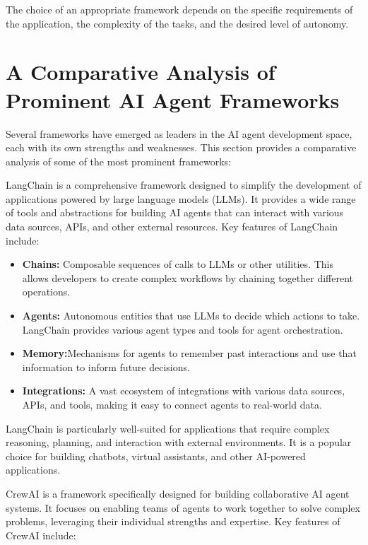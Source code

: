 \documentclass[a4paper,headinclude=on,footinclude=on,12pt,oneside]{scrbook}
\begin{document}
The choice of an appropriate framework depends on the specific requirements of the application, the complexity of the tasks, and the desired level of autonomy.

\section*{A Comparative Analysis of Prominent AI Agent Frameworks}

Several frameworks have emerged as leaders in the AI agent development space, each with its own strengths and weaknesses. This section provides a comparative analysis of some of the most prominent frameworks:


LangChain is a comprehensive framework designed to simplify the development of applications powered by large language models (LLMs). It provides a wide range of tools and abstractions for building AI agents that can interact with various data sources, APIs, and other external resources. Key features of LangChain include:

\begin{itemize}
\item \textbf{Chains:}  Composable sequences of calls to LLMs or other utilities. This allows developers to create complex workflows by chaining together different operations.
\item \textbf{Agents:} Autonomous entities that use LLMs to decide which actions to take. LangChain provides various agent types and tools for agent orchestration.
\item \textbf{Memory:}Mechanisms for agents to remember past interactions and use that information to inform future decisions.
\item \textbf{Integrations:} A vast ecosystem of integrations with various data sources, APIs, and tools, making it easy to connect agents to real-world data.
\end{itemize}

LangChain is particularly well-suited for applications that require complex reasoning, planning, and interaction with external environments. It is a popular choice for building chatbots, virtual assistants, and other AI-powered applications.


CrewAI is a framework specifically designed for building collaborative AI agent systems. It focuses on enabling teams of agents to work together to solve complex problems, leveraging their individual strengths and expertise. Key features of CrewAI include:
\end{document}
